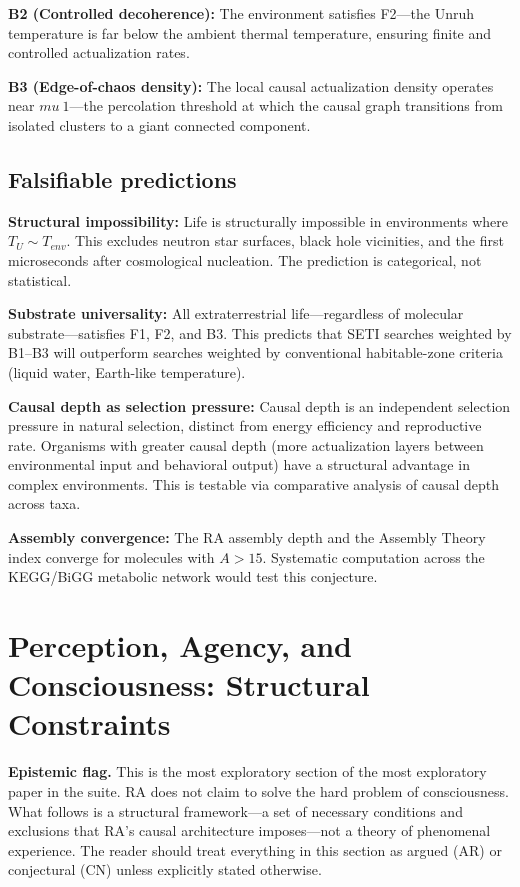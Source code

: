\documentclass[11pt]{article}
\def\mu{mu}%
\def\mathrm#1{#1}%
\def\approx{~}%
\begin{document}
\textbf{B2 (Controlled decoherence):} The environment satisfies F2---the Unruh temperature is far below the ambient thermal temperature, ensuring finite and controlled actualization rates.

\textbf{B3 (Edge-of-chaos density):} The local causal actualization density operates near $\mu\approx 1$---the percolation threshold at which the causal graph transitions from isolated clusters to a giant connected component.

\subsection{Falsifiable predictions}

\textbf{Structural impossibility:} Life is structurally impossible in environments where $T_U\sim T_{\mathrm{env}}$. This excludes neutron star surfaces, black hole vicinities, and the first microseconds after cosmological nucleation. The prediction is categorical, not statistical.

\textbf{Substrate universality:} All extraterrestrial life---regardless of molecular substrate---satisfies F1, F2, and B3. This predicts that SETI searches weighted by B1--B3 will outperform searches weighted by conventional habitable-zone criteria (liquid water, Earth-like temperature).

\textbf{Causal depth as selection pressure:} Causal depth is an independent selection pressure in natural selection, distinct from energy efficiency and reproductive rate. Organisms with greater causal depth (more actualization layers between environmental input and behavioral output) have a structural advantage in complex environments. This is testable via comparative analysis of causal depth across taxa.

\textbf{Assembly convergence:} The RA assembly depth and the Assembly Theory index converge for molecules with $A>15$. Systematic computation across the KEGG/BiGG metabolic network would test this conjecture.

\section{Perception, Agency, and Consciousness: Structural Constraints}
\label{sec:consciousness}

\textbf{Epistemic flag.} This is the most exploratory section of the most exploratory paper in the suite. RA does not claim to solve the hard problem of consciousness. What follows is a structural framework---a set of necessary conditions and exclusions that RA's causal architecture imposes---not a theory of phenomenal experience. The reader should treat everything in this section as argued (AR) or conjectural (CN) unless explicitly stated otherwise.
\end{document}
